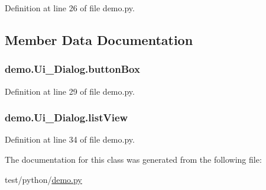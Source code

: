 Definition at line 26 of file demo.\+py.



\subsection{Member Data Documentation}
\subsubsection[{\texorpdfstring{button\+Box}{buttonBox}}]{\setlength{\rightskip}{0pt plus 5cm}demo.\+Ui\+\_\+\+Dialog.\+button\+Box}\hypertarget{classdemo_1_1_ui___dialog_a2ac04ff1451f1425b8b7b43d02e43403}{}\label{classdemo_1_1_ui___dialog_a2ac04ff1451f1425b8b7b43d02e43403}


Definition at line 29 of file demo.\+py.

\subsubsection[{\texorpdfstring{list\+View}{listView}}]{\setlength{\rightskip}{0pt plus 5cm}demo.\+Ui\+\_\+\+Dialog.\+list\+View}\hypertarget{classdemo_1_1_ui___dialog_a7313bbdda0b87d56fcdce1cb67ea3fce}{}\label{classdemo_1_1_ui___dialog_a7313bbdda0b87d56fcdce1cb67ea3fce}


Definition at line 34 of file demo.\+py.



The documentation for this class was generated from the following file\+:\begin{DoxyCompactItemize}
\item 
test/python/\hyperlink{demo_8py}{demo.\+py}\end{DoxyCompactItemize}
